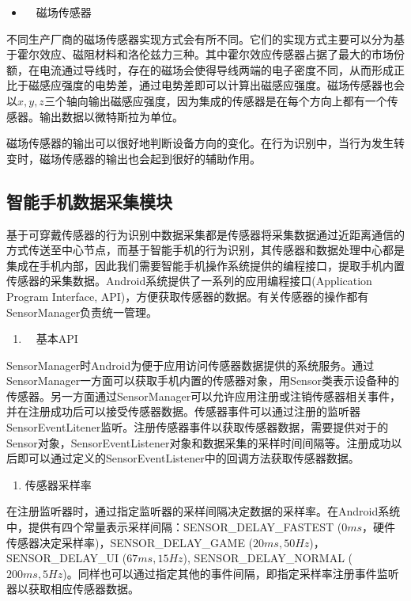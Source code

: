 \begin{itemize}
	\item　磁场传感器
\end{itemize}
\par 不同生产厂商的磁场传感器实现方式会有所不同。它们的实现方式主要可以分为基于霍尔效应、磁阻材料和洛伦兹力三种。其中霍尔效应传感器占据了最大的市场份额，在电流通过导线时，存在的磁场会使得导线两端的电子密度不同，从而形成正比于磁感应强度的电势差，通过电势差即可以计算出磁感应强度。磁场传感器也会以$x,  y,  z$三个轴向输出磁感应强度，因为集成的传感器是在每个方向上都有一个传感器。输出数据以微特斯拉为单位。
\par 磁场传感器的输出可以很好地判断设备方向的变化。在行为识别中，当行为发生转变时，磁场传感器的输出也会起到很好的辅助作用。

\subsection{智能手机数据采集模块}
\par 基于可穿戴传感器的行为识别中数据采集都是传感器将采集数据通过近距离通信的方式传送至中心节点，而基于智能手机的行为识别，其传感器和数据处理中心都是集成在手机内部，因此我们需要智能手机操作系统提供的编程接口，提取手机内置传感器的采集数据。Android系统提供了一系列的应用编程接口(Application Program Interface, API)，方便获取传感器的数据。有关传感器的操作都有SensorManager负责统一管理。

\begin{enumerate}[(1)]
	\item　基本API
\end{enumerate}
\par SensorManager时Android为便于应用访问传感器数据提供的系统服务。通过SensorManager一方面可以获取手机内置的传感器对象，用Sensor类表示设备种的传感器。另一方面通过SensorManager可以允许应用注册或注销传感器相关事件，并在注册成功后可以接受传感器数据。传感器事件可以通过注册的监听器SensorEventLitener监听。注册传感器事件以获取传感器数据，需要提供对于的Sensor对象，SensorEventListener对象和数据采集的采样时间间隔等。注册成功以后即可以通过定义的SensorEventListener中的回调方法获取传感器数据。

\begin{enumerate}[(2)]
	\item 传感器采样率
\end{enumerate}
\par 在注册监听器时，通过指定监听器的采样间隔决定数据的采样率。在Android系统中，提供有四个常量表示采样间隔：SENSOR\_DELAY\_FASTEST ($0ms$，硬件传感器决定采样率)，SENSOR\_DELAY\_GAME ($20ms, 50Hz$)，SENSOR\_DELAY\_UI ($67ms, 15Hz$), SENSOR\_DELAY\_NORMAL ($200ms, 5Hz$)。同样也可以通过指定其他的事件间隔，即指定采样率注册事件监听器以获取相应传感器数据。

